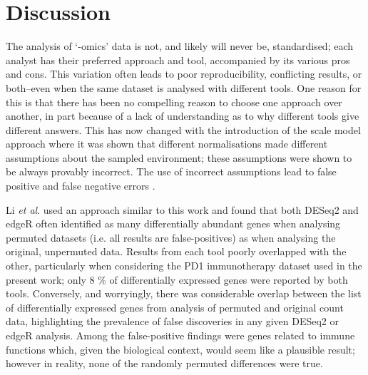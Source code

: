 \documentclass{article}
\begin{document}
\section{Discussion}

The analysis of `-omics' data is not, and likely will never be, standardised; each analyst has their preferred approach and tool, accompanied by its various pros and cons. This variation often leads to poor reproducibility, conflicting results, or both--even when the same dataset is analysed with different tools. One reason for this is that there has been no compelling reason to choose one approach over another, in part because of a lack of understanding as to why different tools give different answers. This has now changed with the introduction of the scale model approach  \cite{nixon_scale_2024} where it was shown that different normalisations made different assumptions about the sampled environment; these assumptions were shown to be always provably incorrect. The use of incorrect assumptions lead to false positive and false negative errors \cite{nixon_scale_2024, nixon_incorporating_2025, gloor_explicit_2025, mcgovern_replacing_2025}.

Li \textit{et al}. \cite{li_exaggerated_2022} used an approach similar to this work and found that both DESeq2 and edgeR often identified as many differentially abundant genes when analysing permuted datasets (i.e. all results are false-positives) as when analysing the original, unpermuted data. Results from each tool poorly overlapped with the other, particularly when considering the PD1 immunotherapy dataset used in the present work; only 8 \% of differentially expressed genes were reported by both tools. Conversely, and worryingly, there was considerable overlap between the list of differentially expressed genes from analysis of permuted and original count data, highlighting the prevalence of false discoveries in any given DESeq2 or edgeR analysis. Among the false-positive findings were genes related to immune functions which, given the biological context, would seem like a plausible result; however in reality, none of the randomly permuted differences were true.
\end{document}

